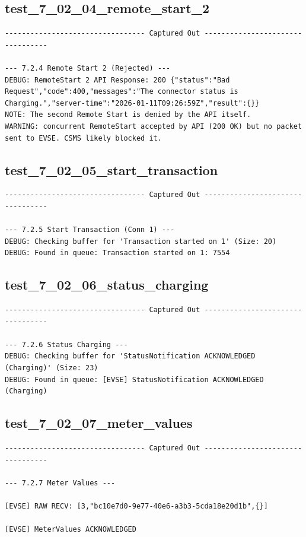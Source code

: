 \documentclass{article}
\begin{document}
\subsection*{test\_7\_02\_04\_remote\_start\_2}
\begin{lstlisting}
--------------------------------- Captured Out ---------------------------------

--- 7.2.4 Remote Start 2 (Rejected) ---
DEBUG: RemoteStart 2 API Response: 200 {"status":"Bad Request","code":400,"messages":"The connector status is Charging.","server-time":"2026-01-11T09:26:59Z","result":{}}
NOTE: The second Remote Start is denied by the API itself.
WARNING: concurrent RemoteStart accepted by API (200 OK) but no packet sent to EVSE. CSMS likely blocked it.
\end{lstlisting}
\subsection*{test\_7\_02\_05\_start\_transaction}
\begin{lstlisting}
--------------------------------- Captured Out ---------------------------------

--- 7.2.5 Start Transaction (Conn 1) ---
DEBUG: Checking buffer for 'Transaction started on 1' (Size: 20)
DEBUG: Found in queue: Transaction started on 1: 7554
\end{lstlisting}
\subsection*{test\_7\_02\_06\_status\_charging}
\begin{lstlisting}
--------------------------------- Captured Out ---------------------------------

--- 7.2.6 Status Charging ---
DEBUG: Checking buffer for 'StatusNotification ACKNOWLEDGED (Charging)' (Size: 23)
DEBUG: Found in queue: [EVSE] StatusNotification ACKNOWLEDGED (Charging)
\end{lstlisting}
\subsection*{test\_7\_02\_07\_meter\_values}
\begin{lstlisting}
--------------------------------- Captured Out ---------------------------------

--- 7.2.7 Meter Values ---

[EVSE] RAW RECV: [3,"bc10e7d0-9e77-40e6-a3b3-5cda18e20d1b",{}]

[EVSE] MeterValues ACKNOWLEDGED
\end{lstlisting}
\end{document}
